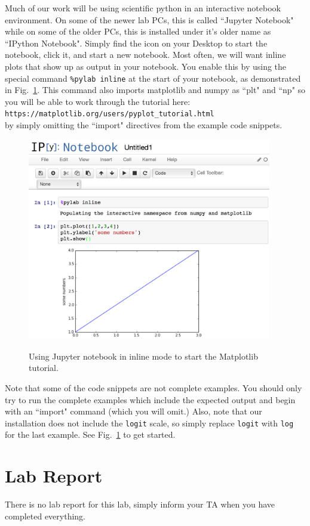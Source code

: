 \documentclass[12pt]{article}
\begin{document}
Much of our work will be using scientific python in an interactive notebook environment.  On some of the newer lab PCs, this is called ``Jupyter Notebook" while on some of the older PCs, this is installed under it's older name as ``IPython Notebook".  Simply find the icon on your Desktop to start the notebook, click it, and start a new notebook.  Most often, we will want inline plots that show up as output in your notebook.  You enable this by using the special command {\tt \%pylab inline} at the start of your notebook, as demonstrated in Fig.~\ref{fig:notebook}.  This command also imports matplotlib and numpy as ``plt" and ``np" so you will be able to work through the tutorial here:\\
{\tt https://matplotlib.org/users/pyplot\_tutorial.html}\\
by simply omitting the ``import" directives from the example code snippets.
\begin{figure}[htbp]
\begin{center}
\includegraphics[width=0.95\textwidth]{figs/notebook.png}\\
\caption{\label{fig:notebook}
Using Jupyter notebook in inline mode to start the Matplotlib tutorial.}
\end{center}
\end{figure}
Note that some of the code snippets are not complete examples.  You should only try to run the complete examples which include the expected output and begin with an ``import" command (which you will omit.)  Also, note that our installation does not include the {\tt logit} scale, so simply replace {\tt logit} with {\tt log} for the last example.   See Fig.~\ref{fig:notebook} to get started.

\section{Lab Report}

There is no lab report for this lab, simply inform your TA when you have completed everything.
 
\end{document}
